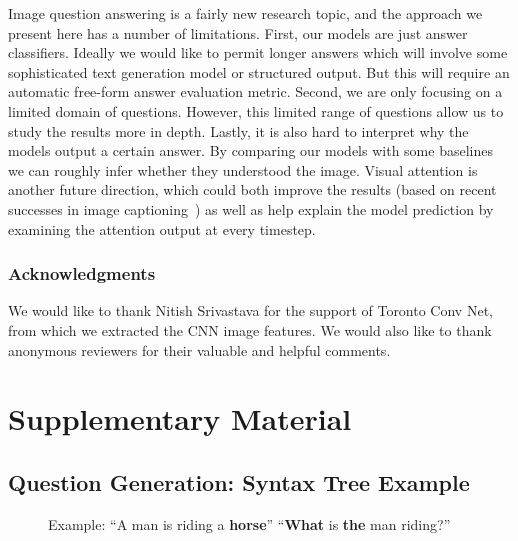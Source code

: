 \documentclass{article} \usepackage{nips15submit_e,times}
\renewcommand{\#}[1]{\textbf{#1}}
\begin{document}
Image question answering is a fairly new research topic, and the approach we
present here has a number of limitations. First, our models are just answer
classifiers. Ideally we would like to permit longer answers which will involve
some sophisticated text generation model or structured output. But this will
require an automatic free-form answer evaluation metric. Second, we are only
focusing on a limited domain of questions. However, this limited range of
questions allow us to study the results more in depth. Lastly, it is also hard
to interpret why the models output a certain answer. By comparing our models with
some baselines we can roughly infer whether they understood the image.
Visual attention is another future direction, which could both improve the
results (based on recent successes in image captioning~\cite{xu15}) as well as
help explain the model prediction by examining the attention output at every
timestep.

\subsubsection*{Acknowledgments}

We would like to thank Nitish Srivastava for the support of Toronto Conv Net,
from which we extracted the CNN image features. We would also like to thank
anonymous reviewers for their valuable and helpful comments.

\begin{small}


\end{small}
 \appendix
\section{Supplementary Material}
\subsection{Question Generation: Syntax Tree Example}
\begin{figure}[h!]
\centering
\small
\scalebox{0.8}{
\Tree [.S [.NP [.DET a ] [.N man ] ] [.VP [.V is ] [.NP [.VBG riding ] [.NP
[.DET a ] [.N horse ] ] ] ] ]} 
\vspace{5mm}
\caption{Example: ``A man is riding a \textbf{horse}''  ``\textbf{What} is 
\textbf{the} man riding?''}
\label{fig:what_gen}
\end{figure}
\end{document}
